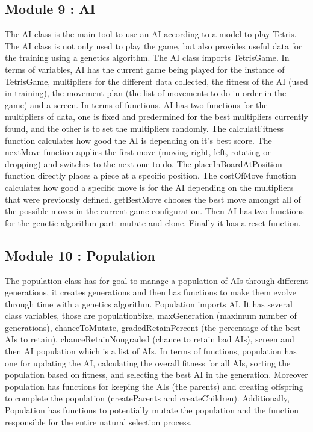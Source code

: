 \documentclass[conference]{IEEEtran}
\begin{document}
\subsection{Module 9 : AI}
The AI class is the main tool to use an AI according to a model to play Tetris. The AI class is not only used to play the game, but also provides useful data for the training using a genetics algorithm.
The AI class imports TetrisGame. In terms of variables, AI has the current game being played for the instance of TetrisGame, multipliers for the different data collected, the fitness of the AI (used in training), the movement plan (the list of movements to do in order in the game) and a screen. In terms of functions, AI has two functions for the multipliers of data, one is fixed and predermined for the best  multipliers currently found, and the other is to set the multipliers randomly. The calculatFitness function calculates how good the AI is depending on it's best score. The nextMove function applies the first move (moving right, left, rotating or dropping)  and switches to the next one to do. The placeInBoardAtPosition function directly places a piece at a specific position. The costOfMove function calculates how good a specific move is for the AI depending on the multipliers that were previously defined. getBestMove chooses the best move amongst all of the possible moves in the current game configuration. Then AI has two functions for the genetic algorithm part: mutate and clone. Finally it has a reset function.

\subsection{Module 10 : Population}
The population class has for goal to manage a population of AIs through different generations, it creates generations and then has functions to make them evolve through time with a genetics algorithm.
Population imports AI. It has several class variables, those are populationSize, maxGeneration (maximum number of generations), chanceToMutate, gradedRetainPercent (the percentage of the best AIs to retain), chanceRetainNongraded (chance to retain bad AIs), screen and then AI population which is a list of AIs.
In terms of functions, population has one for updating the AI, calculating the overall fitness for all AIs, sorting the population based on fitness, and selecting the best AI in the generation. Moreover population has functions for keeping the AIs (the parents) and creating offspring to complete the population (createParents and createChildren). Additionally, Population has functions to potentially mutate the population and the function responsible for the entire natural selection process.
\end{document}
